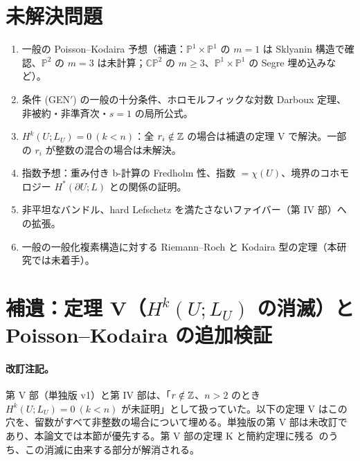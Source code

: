 \section{未解決問題}
\begin{enumerate}
\item 一般の Poisson--Kodaira 予想（補遺：$\mathbb P^1\times\mathbb P^1$ の $m=1$ は Sklyanin 構造で確認、$\mathbb P^2$ の $m=3$ は未計算；$\mathbb{CP}^2$ の $m\ge3$、$\mathbb P^1\times\mathbb P^1$ の Segre 埋め込みなど）。
\item 条件 (GEN$'$) の一般の十分条件、ホロモルフィックな対数 Darboux 定理、非被約・非準斉次・$s=1$ の局所公式。
\item $H^k(U;L_U)=0\ (k<n)$：全 $r_i\notin\mathbb Z$ の場合は補遺の定理 V で解決。一部の $r_i$ が整数の混合の場合は未解決。
\item 指数予想：重み付き b-計算の Fredholm 性、指数 $=\chi(U)$、境界のコホモロジー $H^*(\partial U;L)$ との関係の証明。
\item 非平坦なバンドル、hard Lefschetz を満たさないファイバー（第 IV 部）への拡張。
\item 一般の一般化複素構造に対する Riemann--Roch と Kodaira 型の定理（本研究では未着手）。
\end{enumerate}


\section{補遺：定理 V（$H^k(U;L_U)$ の消滅）と Poisson--Kodaira の追加検証}\label{sec:addendum}
\paragraph{改訂注記。}第 V 部（単独版 v1）と第 IV 部は、「$r\notin\mathbb Z$、$n>2$ のとき $H^k(U;L_U)=0\ (k<n)$ が未証明」として扱っていた。以下の定理 V はこの穴を、留数がすべて非整数の場合について埋める。単独版の第 V 部は未改訂であり、本論文では本節が優先する。第 V 部の定理 K と簡約定理に残る\tQ\ のうち、この消滅に由来する部分が解消される。

